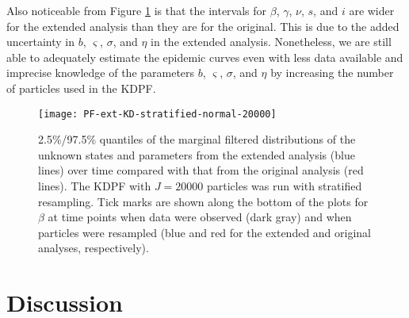 \documentclass{elsarticle}
\begin{document}
Also noticeable from Figure \ref{fig:ext} is that the intervals for $\beta$, $\gamma$, $\nu$, $s$, and $i$ are wider for the extended analysis than they are for the original. This is due to the added uncertainty in $b$, $\varsigma$, $\sigma$, and $\eta$ in the extended analysis. Nonetheless, we are still able to adequately estimate the epidemic curves even with less data available and imprecise knowledge of the parameters $b$, $\varsigma$, $\sigma$, and $\eta$ by increasing the number of particles used in the KDPF.

\begin{figure}
\centering
\texttt{[image: PF-ext-KD-stratified-normal-20000]}
\caption{2.5\%/97.5\% quantiles of the marginal filtered distributions of the unknown states and parameters from the extended analysis (blue lines) over time compared with that from the original analysis (red lines). The KDPF with $J = 20000$ particles was run with stratified resampling. Tick marks are shown along the bottom of the plots for $\beta$ at time points when data were observed (dark gray) and when particles were resampled (blue and red for the extended and original analyses, respectively).} \label{fig:ext}
\end{figure}

\section{Discussion \label{sec:discussion}}



\clearpage



\end{document}
